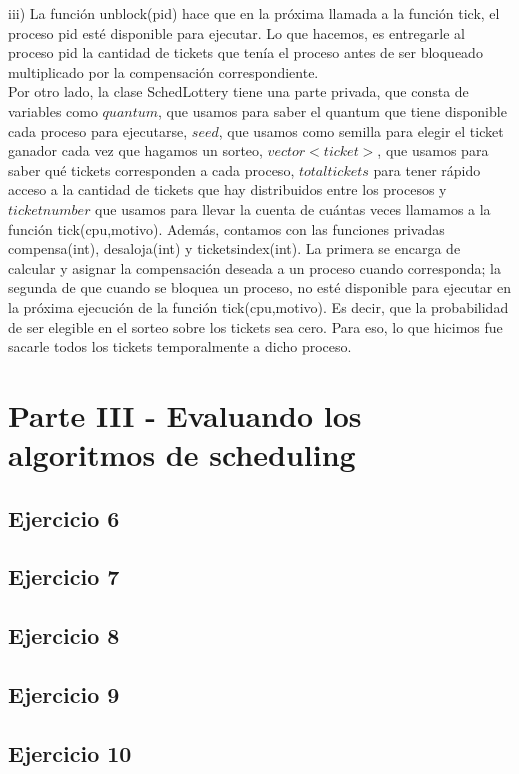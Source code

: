 \documentclass[a4paper]{article}
\begin{document}
iii) La funci\'on unblock(pid) hace que en la pr\'oxima llamada a la funci\'on tick, el proceso pid 
est\'e disponible para ejecutar. Lo que hacemos, es entregarle al proceso pid la cantidad de tickets
que ten\'ia el proceso antes de ser bloqueado multiplicado por la compensaci\'on correspondiente. \\
Por otro lado, la clase SchedLottery tiene una parte privada, que consta de variables como $quantum$, 
que usamos para saber el quantum que tiene disponible cada proceso para ejecutarse, $seed$, que
usamos como semilla para elegir el ticket ganador cada vez que hagamos un sorteo, $vector<ticket>$, que
usamos para saber qu\'e tickets corresponden a cada proceso, $totaltickets$ para tener r\'apido acceso
a la cantidad de tickets que hay distribuidos entre los procesos y $ticketnumber$ que usamos para 
llevar la cuenta de cu\'antas veces llamamos a la funci\'on tick(cpu,motivo). Adem\'as, contamos con 
las funciones privadas compensa(int), desaloja(int) y ticketsindex(int). La primera se encarga de
calcular y asignar la compensaci\'on deseada a un proceso cuando corresponda; la segunda de que cuando
se bloquea un proceso, no est\'e disponible para ejecutar en la pr\'oxima ejecuci\'on de la funci\'on
tick(cpu,motivo). Es decir, que la probabilidad de ser elegible en el sorteo sobre los tickets sea cero.
Para eso, lo que hicimos fue sacarle todos los tickets temporalmente a dicho proceso. \\ 




\section{Parte III - Evaluando los algoritmos de scheduling}

\subsection{Ejercicio 6}
\subsection{Ejercicio 7}
\subsection{Ejercicio 8}
\subsection{Ejercicio 9}
\subsection{Ejercicio 10}
\end{document}
